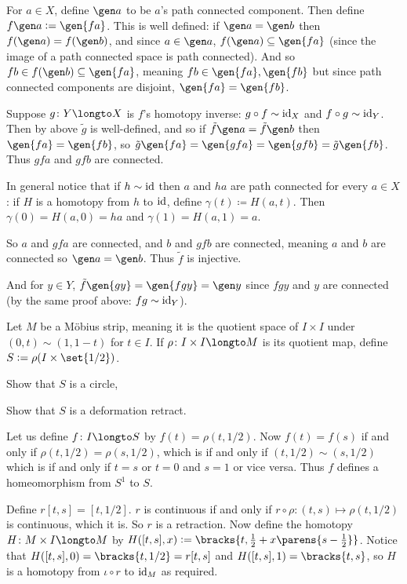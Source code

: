 \eexerc

\benum
    \item For $a\in X$, define $\gen a$ to be $a$'s path connected component.
    Then define $f\gen a\coloneqq\gen{fa}$.
    This is well defined: if $\gen a=\gen b$ then $f(\gen a)=f(\gen b)$, and since $a\in\gen a$, $f(\gen a)\subseteq\gen{fa}$ (since the image of a path connected space is path connected).
    And so $fb\in f(\gen b)\subseteq\gen{fa}$, meaning $fb\in\gen{fa},\gen{fb}$ but since path connected components are disjoint, $\gen{fa}=\gen{fb}$.
    \item Suppose $g\colon Y\longto X$ is $f$'s homotopy inverse: $g\circ f\sim{\rm id}_X$ and $f\circ g\sim{\rm id}_Y$.
    Then by above $\tilde g$ is well-defined, and so if $\tilde f\gen a=\tilde f\gen b$ then $\gen{fa}=\gen{fb}$, so $\tilde g\gen{fa}=\gen{gfa}=\gen{gfb}=\tilde g\gen{fb}$.
    Thus $gfa$ and $gfb$ are connected.

    In general notice that if $h\sim{\rm id}$ then $a$ and $ha$ are path connected for every $a\in X$: if $H$ is a homotopy from $h$ to ${\rm id}$, define $\gamma(t)\coloneqq H(a,t)$.
    Then $\gamma(0)=H(a,0)=ha$ and $\gamma(1)=H(a,1)=a$.

    So $a$ and $gfa$ are connected, and $b$ and $gfb$ are connected, meaning $a$ and $b$ are connected so $\gen a=\gen b$.
    Thus $\tilde f$ is injective.

    And for $y\in Y$, $\tilde f\gen{gy}=\gen{fgy}=\gen y$ since $fgy$ and $y$ are connected (by the same proof above: $fg\sim{\rm id}_Y$).
\eenum

\bexerc

    Let $M$ be a M\"obius strip, meaning it is the quotient space of $I\times I$ under $(0,t)\sim(1,1-t)$ for $t\in I$.
    If $\rho\colon I\times I\longto M$ is its quotient map, define $S\coloneqq\rho(I\times\set{1/2})$.
    \benum
        \item Show that $S$ is a circle,
        \item Show that $S$ is a deformation retract.
    \eenum

\eexerc

\benum
    \item Let us define $f\colon I\longto S$ by $f(t)=\rho(t,1/2)$.
    Now $f(t)=f(s)$ if and only if $\rho(t,1/2)=\rho(s,1/2)$, which is if and only if $(t,1/2)\sim(s,1/2)$ which is if and only if $t=s$ or $t=0$ and $s=1$ or vice versa.
    Thus $f$ defines a homeomorphism from $S^1$ to $S$.
    \item Define $r[t,s]=[t,1/2]$.
    $r$ is continuous if and only if $r\circ\rho\colon(t,s)\mapsto\rho(t,1/2)$ is continuous, which it is.
    So $r$ is a retraction.
    Now define the homotopy $H\colon M\times I\longto M$ by $H([t,s],x)\coloneqq\bracks{t,\frac12+x\parens{s-\frac12}}$.
    Notice that $H([t,s],0)=\bracks{t,1/2}=r[t,s]$ and $H([t,s],1)=\bracks{t,s}$, so $H$ is a homotopy from $\iota\circ r$ to ${\rm id}_M$ as required.
\eenum

\bye

